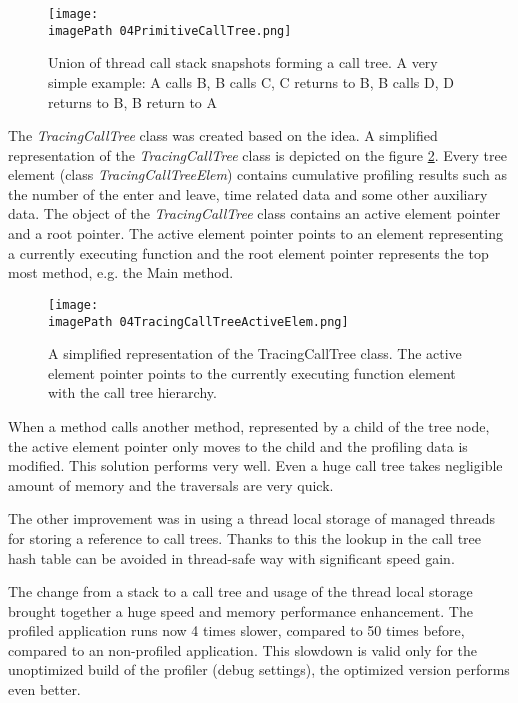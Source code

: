 \begin{figure}
	\centering
		\texttt{[image: \\imagePath 04PrimitiveCallTree.png]}
		\caption{ Union of thread call stack snapshots forming a call tree. A very simple example: A calls  B, B calls C, C returns to B, B calls D, D returns to B, B return to A }
	\label{fig:04PrimitiveCallTree}
\end{figure}

The \textit{TracingCallTree} class was created based on the idea.
A simplified representation of the \textit{TracingCallTree} class is depicted on the figure \ref{fig:04TracingCallTreeActiveElem}. Every tree element (class \textit{TracingCallTreeElem}) contains cumulative profiling results such as the number of the enter and leave, time related data and some other auxiliary data. The object of the \textit{TracingCallTree} class contains an active element pointer and a root pointer. The active element pointer points to an element representing a currently executing function and the root element pointer represents the top most method, e.g. the Main method. 


\begin{figure}
	\centering
		\texttt{[image: \\imagePath 04TracingCallTreeActiveElem.png]}
		\caption{A simplified representation of the TracingCallTree class. The active element pointer points to the currently executing function element with the call tree hierarchy. }
	\label{fig:04TracingCallTreeActiveElem}
\end{figure}


When a method calls another method, represented by a child of the tree node, the active element pointer only moves to the child and the profiling data is modified. This solution performs very well. Even a huge call tree takes negligible amount of memory and the traversals are very quick. 

The other improvement was in using a thread local storage of managed threads for storing a reference to call trees. Thanks to this the lookup in the call tree hash table can be avoided in thread-safe way with significant speed gain. 

The change from a stack to a call tree and usage of the thread local storage brought together a huge speed and memory performance enhancement. The profiled application runs now 4 times slower, compared to 50 times before, compared to an non-profiled application. This slowdown is valid only for the unoptimized build of the profiler (debug settings), the optimized version performs even better. 

